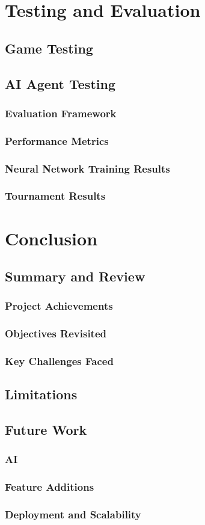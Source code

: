 \chapter{Testing and Evaluation}
\section{Game Testing}
\section{AI Agent Testing}
\subsection{Evaluation Framework}
\subsection{Performance Metrics}
\subsection{Neural Network Training Results}
\subsection{Tournament Results}


\chapter{Conclusion}
\section{Summary and Review}
\subsection{Project Achievements}
\subsection{Objectives Revisited}
\subsection{Key Challenges Faced}
\section{Limitations}
\section{Future Work}
\subsection{AI}
\subsection{Feature Additions}
\subsection{Deployment and Scalability}



